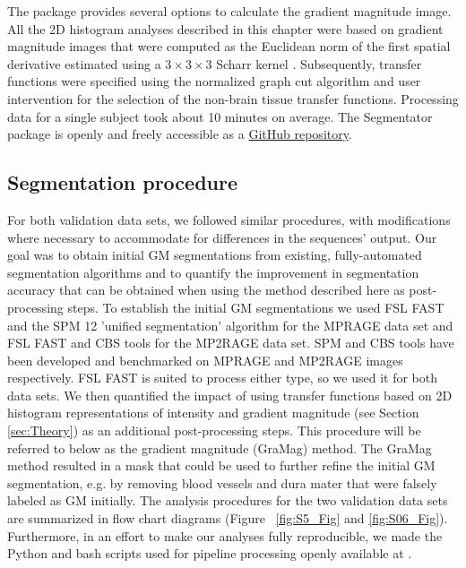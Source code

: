 The package provides several options to calculate the gradient magnitude image. All the 2D histogram analyses described in this chapter were based on gradient magnitude images that were computed as the Euclidean norm of the first spatial derivative estimated using a $3 \times 3 \times 3$ Scharr kernel \parencite{Scharr2000, Jahne2000}. Subsequently, transfer functions were specified using the normalized graph cut algorithm and user intervention for the selection of the non-brain tissue transfer functions. Processing data for a single subject took about 10 minutes on average. The Segmentator package is openly and freely accessible as a \href{https://github.com/ofgulban/segmentator}{GitHub repository}.

\subsection{Segmentation procedure}
For both validation data sets, we followed similar procedures, with modifications where necessary to accommodate for differences in the sequences' output. Our goal was to obtain initial GM segmentations from existing, fully-automated segmentation algorithms and to quantify the improvement in segmentation accuracy that can be obtained when using the method described here as post-processing steps. To establish the initial GM segmentations we used FSL FAST \parencite{Zhang2001} and the SPM 12 'unified segmentation' algorithm \parencite{Ashburner2005} for the MPRAGE data set and FSL FAST and CBS tools \parencite{Bazin2014} for the MP2RAGE data set. SPM and CBS tools have been developed and benchmarked on MPRAGE and MP2RAGE images respectively. FSL FAST is suited to process either type, so we used it for both data sets. We then quantified the impact of using transfer functions based on 2D histogram representations of intensity and gradient magnitude (see Section \ref{sec:Theory}) as an additional post-processing steps. This procedure will be referred to below as the gradient magnitude (GraMag) method. The GraMag method resulted in a mask that could be used to further refine the initial GM segmentation, e.g. by removing blood vessels and dura mater that were falsely labeled as GM initially. The analysis procedures for the two validation data sets are summarized in flow chart diagrams (Figure ~\ref{fig:S5_Fig} and \ref{fig:S06_Fig}). Furthermore, in an effort to make our analyses fully reproducible, we made the Python and bash scripts used for pipeline processing openly available at \cite{segmentator_processing_scripts}.


